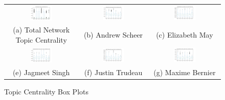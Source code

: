 \begin{figure}[h!]
  \centering
  \begin{tabular}{ccc}
  \includegraphics[width=0.33\textwidth]{Figures/total_network_box_plot} &
  \includegraphics[width=0.33\textwidth]{Figures/AS_box_plot} &
  \includegraphics[width=0.33\textwidth]{Figures/EM_box_plot} \\
  (a) Total Network Topic Centrality & (b) Andrew Scheer & (c) Elizabeth May \\[6pt]
  \includegraphics[width=0.33\textwidth]{Figures/JS_box_plot} &
  \includegraphics[width=0.33\textwidth]{Figures/JT_box_plot} &
  \includegraphics[width=0.33\textwidth]{Figures/MB_box_plot} \\
  (e) Jagmeet Singh & (f) Justin Trudeau & (g) Maxime Bernier \\[6pt]
  \end{tabular}
  \caption[Topic Centrality Box Plots]{Topic Centrality Box Plots}
  \label{fig:topic_cent_box_plots}
\end{figure}

